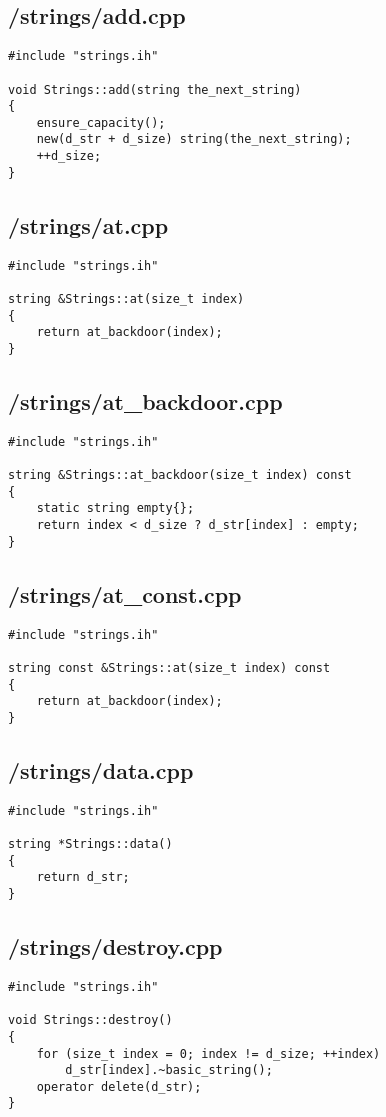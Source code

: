 \documentclass{article}
\begin{document}
\subsection*{/strings/add.cpp}
\begin{verbatim}
#include "strings.ih"

void Strings::add(string the_next_string)
{
    ensure_capacity();
    new(d_str + d_size) string(the_next_string);
    ++d_size;
}

\end{verbatim}
\subsection*{/strings/at.cpp}
\begin{verbatim}
#include "strings.ih"

string &Strings::at(size_t index)
{
    return at_backdoor(index);
}
\end{verbatim}
\subsection*{/strings/at\_backdoor.cpp}
\begin{verbatim}
#include "strings.ih"

string &Strings::at_backdoor(size_t index) const
{
    static string empty{};
    return index < d_size ? d_str[index] : empty; 
}

\end{verbatim}
\subsection*{/strings/at\_const.cpp}
\begin{verbatim}
#include "strings.ih"

string const &Strings::at(size_t index) const
{
    return at_backdoor(index);
}
\end{verbatim}
\subsection*{/strings/data.cpp}
\begin{verbatim}
#include "strings.ih"

string *Strings::data()
{
    return d_str;
}
\end{verbatim}
\subsection*{/strings/destroy.cpp}
\begin{verbatim}
#include "strings.ih"

void Strings::destroy()
{
    for (size_t index = 0; index != d_size; ++index)
        d_str[index].~basic_string();
    operator delete(d_str);
}
\end{verbatim}
\end{document}
